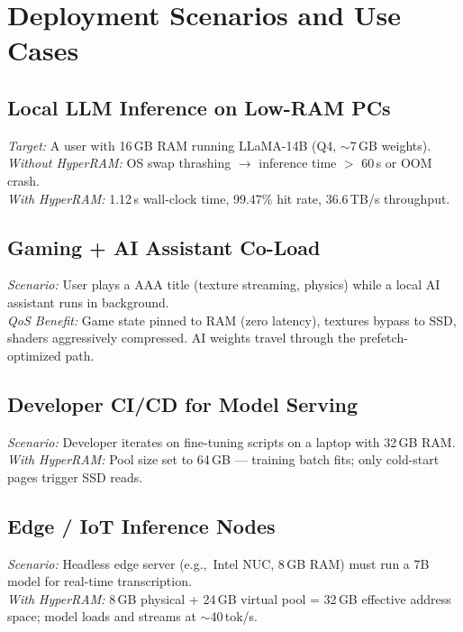 \documentclass[11pt,a4paper]{article}
\begin{document}
\section{Deployment Scenarios and Use Cases}
\label{sec:deployment}

\subsection{Local LLM Inference on Low-RAM PCs}

\textit{Target:} A user with 16\,GB RAM running LLaMA-14B (Q4, $\sim$7\,GB weights). \\
\textit{Without HyperRAM:} OS swap thrashing $\to$ inference time $>$ 60\,s or OOM crash. \\
\textit{With HyperRAM:} 1.12\,s wall-clock time, 99.47\% hit rate, 36.6\,TB/s throughput.

\subsection{Gaming + AI Assistant Co-Load}

\textit{Scenario:} User plays a AAA title (texture streaming, physics) while a local AI assistant runs in background. \\
\textit{QoS Benefit:} Game state pinned to RAM (zero latency), textures bypass to SSD, shaders aggressively compressed. AI weights travel through the prefetch-optimized path.

\subsection{Developer CI/CD for Model Serving}

\textit{Scenario:} Developer iterates on fine-tuning scripts on a laptop with 32\,GB RAM. \\
\textit{With HyperRAM:} Pool size set to 64\,GB --- training batch fits; only cold-start pages trigger SSD reads.

\subsection{Edge / IoT Inference Nodes}

\textit{Scenario:} Headless edge server (e.g.,~Intel NUC, 8\,GB RAM) must run a 7B model for real-time transcription. \\
\textit{With HyperRAM:} 8\,GB physical + 24\,GB virtual pool = 32\,GB effective address space; model loads and streams at $\sim$40\,tok/s.
\end{document}
